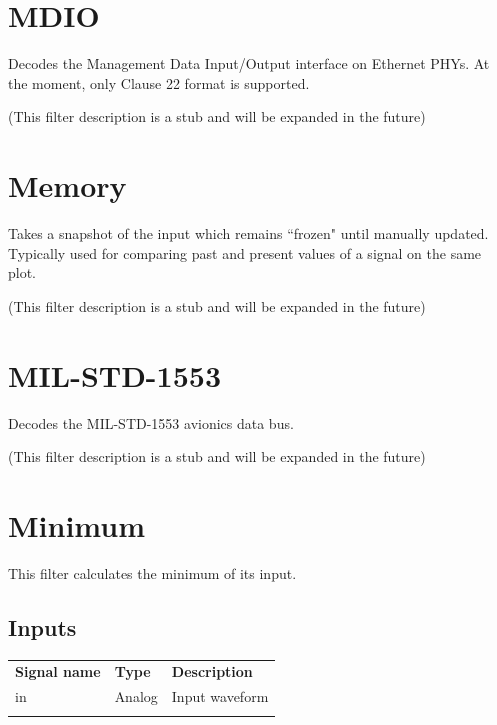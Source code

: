 \pagebreak
\section{MDIO}

Decodes the Management Data Input/Output interface on Ethernet PHYs. At the moment, only Clause 22 format is supported.

(This filter description is a stub and will be expanded in the future)

\pagebreak
\section{Memory}

Takes a snapshot of the input which remains ``frozen" until manually updated. Typically used for comparing past and
present values of a signal on the same plot.

(This filter description is a stub and will be expanded in the future)

\pagebreak
\section{MIL-STD-1553}

Decodes the MIL-STD-1553 avionics data bus.

(This filter description is a stub and will be expanded in the future)

\pagebreak
\section{Minimum}
\label{filter:minimum}

This filter calculates the minimum of its input.

\subsection{Inputs}
\begin{tabularx}{16cm}{llX}
\thickhline
\textbf{Signal name} & \textbf{Type} & \textbf{Description} \\
\thickhline
in & Analog & Input waveform \\
\thickhline
\end{tabularx}

